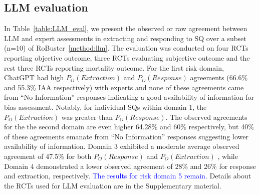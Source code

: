 \documentclass[sn-mathphys,Numbered]{sn-jnl}%
\theoremstyle{thmstyleone}%
\theoremstyle{thmstyletwo}%
\theoremstyle{thmstylethree}%
\begin{document}
%
%
%
\subsection{LLM evaluation}
%
In Table~\ref{table:LLM_eval}, we present the observed or raw agreement between LLM and expert assessments in extracting and responding to SQ over a subset (n=10) of RoBuster~\ref{method:llm}. 
The evaluation was conducted on four RCTs reporting objective outcome, three RCTs evaluating subjective outcome and the rest three RCTs reporting mortality outcome.
For the first risk domain, ChatGPT had high $P_{O} (Extraction)$ and $P_{O} (Response)$ agreements (66.6\% and 55.3\% IAA respectively) with experts and none of these agreements came from ``No Information'' responses indicating a good availability of information for bias assessment. 
Notably, for individual SQs within domain 1, the $P_{O} (Extraction)$ was greater than $P_{O} (Response)$.
The observed agreements for the the second domain are even higher 64.28\% and 60\% respectively, but 40\% of these agreements emanate from ``No Information'' responses suggesting lower availability of information. 
Domain 3 exhibited a moderate average observed agreement of 47.5\% for both $P_{O} (Response)$ and $P_{O} (Extraction)$ , while Domain 4 demonstrated a lower observed agreement of 28\% and 26\% for response and extraction, respectively.
\textcolor{blue}{The results for risk domain 5 remain.}
Details about the RCTs used for LLM evaluation are in the Supplementary material.
%
%
%
\end{document}
